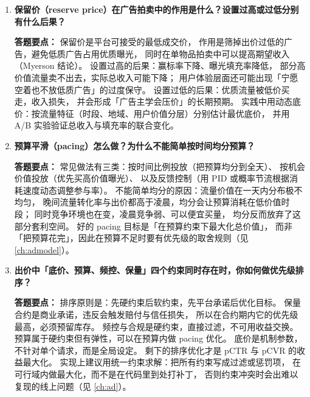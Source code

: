 \begin{interview}[题库与答题要点]
\begin{enumerate}[label=]
  \item[\textcolor{VioletDeep}{\textbf{Q62.}}] \textbf{保留价（reserve price）在广告拍卖中的作用是什么？设置过高或过低分别有什么后果？}
\par\smallskip\noindent\textcolor{VioletDeep}{\textbf{答题要点：}}
保留价是平台可接受的最低成交价，
作用是筛掉出价过低的广告，避免低质广告占用优质曝光，
同时在单物品拍卖中可以提高期望收入（Myerson 结论）。
设置过高的后果：赢标率下降、曝光填充率降低，
部分高价值流量卖不出去，实际总收入可能下降；
用户体验层面还可能出现「宁愿空着也不放低质广告」的过度保守。
设置过低的后果：优质流量被低价买走，收入损失，
并会形成「广告主学会压价」的长期预期。
实践中用动态底价：按流量特征（时段、地域、用户价值分层）分别估计最优底价，
并用 A/B 实验验证总收入与填充率的联合变化。

  \item[\textcolor{VioletDeep}{\textbf{Q63.}}] \textbf{预算平滑（pacing）怎么做？为什么不能简单按时间均分预算？}
\par\smallskip\noindent\textcolor{VioletDeep}{\textbf{答题要点：}}
常见做法有三类：按时间比例投放（把预算均分到全天）、
按机会价值投放（优先买高价值曝光）、
以及反馈控制（用 PID 或概率节流根据消耗速度动态调整参与率）。
不能简单均分的原因：流量价值在一天内分布极不均匀，
晚间流量转化率与出价都高于凌晨，均分会让预算消耗在低价值时段；
同时竞争环境也在变，凌晨竞争弱、可以便宜买量，
均分反而放弃了这部分套利空间。
好的 pacing 目标是「在预算约束下最大化总价值」，
而非「把预算花完」，因此在预算不足时要有优先级的取舍规则（见 \cref{ch:admodel}）。

  \item[\textcolor{VioletDeep}{\textbf{Q64.}}] \textbf{出价中「底价、预算、频控、保量」四个约束同时存在时，你如何做优先级排序？}
\par\smallskip\noindent\textcolor{VioletDeep}{\textbf{答题要点：}}
排序原则是：先硬约束后软约束，先平台承诺后优化目标。
保量合约是商业承诺，违反会触发赔付与信任损失，
所以在合约期内它的优先级最高，必须预留库存。
频控与合规是硬约束，直接过滤，不可用收益交换。
预算属于硬约束但有弹性，可以在预算内做 pacing 优化。
底价是机制参数，不针对单个请求，而是全局设定。
剩下的排序优化才是 pCTR 与 pCVR 的收益最大化。
实现上建议用统一约束求解：把所有约束写成过滤或惩罚项，
在可行域内做最大化，而不是在代码里到处打补丁，
否则约束冲突时会出难以复现的线上问题（见 \cref{ch:ad}）。

\end{enumerate}

\end{interview}

